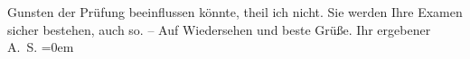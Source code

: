\begin{ledgroupsized}[t]{13cm}
                    Gunsten der Prüfung beeinflussen könnte, theil ich nicht. Sie werden Ihre {\pb}Examen sicher bestehen, auch so.\pend
           \pstart
           – Auf Wiedersehen und beste Grüße. Ihr ergebener{\\[\baselineskip]}\spacefill\mbox{A. S.}\pend
           \leftskip=0em{}\endnumbering{}\end{ledgroupsized}  \newcommand{\dateiname}{L01854}\newcommand{\titel}{Arthur Schnitzler an Albert Ehrenstein, 7. 7. 1909}\newcommand{\editorInnen}{Martin Anton Müller und Gerd-Hermann Susen}
      